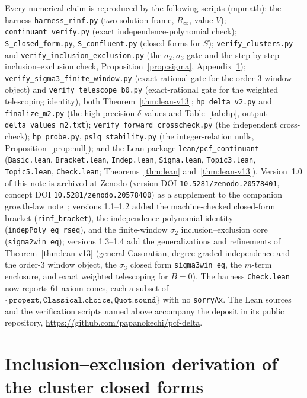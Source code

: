 \documentclass[11pt]{article}
\newcommand{\Rinf}{R_\infty}
\begin{document}
\begin{sloppypar}
Every numerical claim is reproduced by the following scripts (mpmath): the harness
\texttt{harness\_rinf.py} (two-solution frame, $\Rinf$, value $V$);
\texttt{continuant\_verify.py} (exact independence-polynomial check);
\texttt{S\_closed\_form.py}, \texttt{S\_confluent.py} (closed forms for $S$);
\texttt{verify\_clusters.py} and \texttt{verify\_inclusion\_exclusion.py} (the
$\sigma_2,\sigma_3$ gate and the step-by-step inclusion--exclusion check,
Proposition~\ref{prop:sigma}, Appendix~\ref{app:clusters});
\texttt{verify\_sigma3\_finite\_window.py} (exact-rational gate for the order-$3$
window object) and \texttt{verify\_telescope\_b0.py} (exact-rational gate for the
weighted telescoping identity), both Theorem~\ref{thm:lean-v13};
\texttt{hp\_delta\_v2.py} and \texttt{finalize\_m2.py} (the high-precision $\delta$
values and Table~\ref{tab:hp}, output \texttt{delta\_values\_m2.txt});
\texttt{verify\_forward\_crosscheck.py} (the independent cross-check);
\texttt{hp\_probe.py}, \texttt{pslq\_stability.py} (the integer-relation nulls,
Proposition~\ref{prop:null}); and the Lean package \texttt{lean/pcf\_continuant}
(\texttt{Basic.lean}, \texttt{Bracket.lean}, \texttt{Indep.lean},
\texttt{Sigma.lean}, \texttt{Topic3.lean}, \texttt{Topic5.lean}, \texttt{Check.lean};
Theorems~\ref{thm:lean} and~\ref{thm:lean-v13}). Version~1.0 of this note is archived
at Zenodo (version DOI
\texttt{10.5281/zenodo.20578401}, concept DOI \texttt{10.5281/zenodo.20578400}) as a
supplement to the companion growth-law note~\cite{growth}; versions 1.1--1.2 added
the machine-checked closed-form bracket (\texttt{rinf\_bracket}), the
independence-polynomial identity (\texttt{indepPoly\_eq\_rseq}), and the
finite-window $\sigma_2$ inclusion--exclusion core (\texttt{sigma2win\_eq}); versions
1.3--1.4 add the generalizations and refinements of Theorem~\ref{thm:lean-v13} (general
Casoratian, degree-graded independence and the order-$3$ window object, the $\sigma_3$
closed form \texttt{sigma3win\_eq}, the $m$-term
enclosure, and exact weighted telescoping for $B=0$). The harness \texttt{Check.lean}
now reports $61$ axiom cones, each a subset of
$\{\texttt{propext},\texttt{Classical.choice},\texttt{Quot.sound}\}$ with no
\texttt{sorryAx}. The Lean sources and the verification scripts named above
accompany the deposit in its public repository,
\url{https://github.com/papanokechi/pcf-delta}.
\end{sloppypar}

\appendix
\section{Inclusion--exclusion derivation of the cluster closed forms}
\label{app:clusters}
\end{document}
